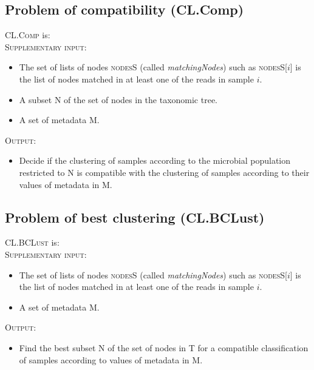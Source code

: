 \documentclass{report}
\begin{document}
\subsection{Problem of compatibility (CL.Comp)}
\textsc{CL.Comp} is:\\

\textsc{Supplementary input:} \begin{itemize}
                \item The set of lists of nodes \textsc{nodesS} (called \emph{matchingNodes}) such as \textsc{nodesS}[$i$] is the list of nodes matched in at least one of the reads in sample $i$.
                \item A subset \textsc{N} of the set of nodes in the taxonomic tree.
                \item A set of metadata \textsc{M}.
                \end{itemize}

\bigskip

\textsc{Output:} \begin{itemize}
                 \item Decide if the clustering of samples according to the microbial population restricted to \textsc{N} is compatible with the clustering of samples according to their values of metadata in \textsc{M}.
                 \end{itemize}

\subsection{Problem of best clustering (CL.BCLust)}
\textsc{CL.BCLust} is:\\

\textsc{Supplementary input:} 
                \begin{itemize}
                \item The set of lists of nodes \textsc{nodesS} (called \emph{matchingNodes}) such as \textsc{nodesS}[$i$] is the list of nodes matched in at least one of the reads in sample $i$.
                \item A set of metadata \textsc{M}.
                \end{itemize}

\bigskip

\textsc{Output:} \begin{itemize}
                 \item Find the best subset \textsc{N} of the set of nodes in \textsc{T} for a compatible classification of samples according to values of metadata in \textsc{M}.
                 \end{itemize}
\end{document}
